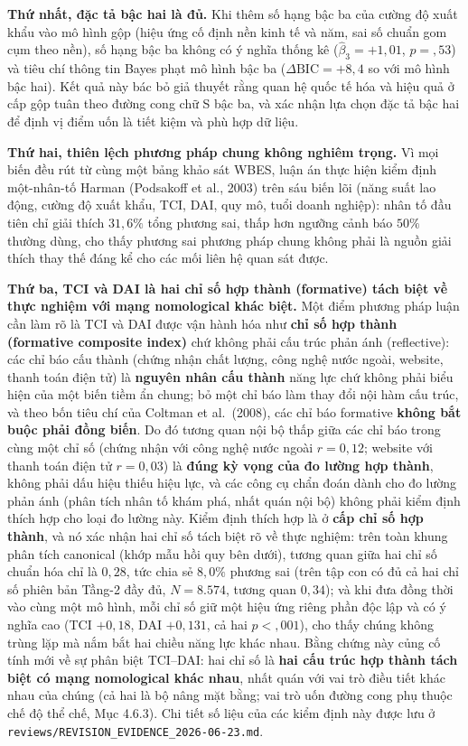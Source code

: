 \documentclass[
  a4paper,
  13pt]{extreport}
\begin{document}
\textbf{Thứ nhất, đặc tả bậc hai là đủ.} Khi thêm số hạng bậc ba của
cường độ xuất khẩu vào mô hình gộp (hiệu ứng cố định nền kinh tế và năm,
sai số chuẩn gom cụm theo nền), số hạng bậc ba không có ý nghĩa thống kê
(\(\hat{\beta}_3 = +1{,}01\), \(p = {,}53\)) và tiêu chí thông tin Bayes
phạt mô hình bậc ba (\(\Delta\mathrm{BIC} = +8{,}4\) so với mô hình bậc
hai). Kết quả này bác bỏ giả thuyết rằng quan hệ quốc tế hóa và hiệu quả
ở cấp gộp tuân theo đường cong chữ S bậc ba, và xác nhận lựa chọn đặc tả
bậc hai để định vị điểm uốn là tiết kiệm và phù hợp dữ liệu.

\textbf{Thứ hai, thiên lệch phương pháp chung không nghiêm trọng.} Vì
mọi biến đều rút từ cùng một bảng khảo sát WBES, luận án thực hiện kiểm
định một-nhân-tố Harman (Podsakoff et al., 2003) trên sáu biến lõi (năng
suất lao động, cường độ xuất khẩu, TCI, DAI, quy mô, tuổi doanh nghiệp):
nhân tố đầu tiên chỉ giải thích \(31{,}6\%\) tổng phương sai, thấp hơn
ngưỡng cảnh báo \(50\%\) thường dùng, cho thấy phương sai phương pháp
chung không phải là nguồn giải thích thay thế đáng kể cho các mối liên
hệ quan sát được.

\textbf{Thứ ba, TCI và DAI là hai chỉ số hợp thành (formative) tách biệt
về thực nghiệm với mạng nomological khác biệt.} Một điểm phương pháp
luận cần làm rõ là TCI và DAI được vận hành hóa như \textbf{chỉ số hợp
thành (formative composite index)} chứ không phải cấu trúc phản ánh
(reflective): các chỉ báo cấu thành (chứng nhận chất lượng, công nghệ
nước ngoài, website, thanh toán điện tử) là \textbf{nguyên nhân cấu
thành} năng lực chứ không phải biểu hiện của một biến tiềm ẩn chung; bỏ
một chỉ báo làm thay đổi nội hàm cấu trúc, và theo bốn tiêu chí của
Coltman et al.~(2008), các chỉ báo formative \textbf{không bắt buộc phải
đồng biến}. Do đó tương quan nội bộ thấp giữa các chỉ báo trong cùng một
chỉ số (chứng nhận với công nghệ nước ngoài \(r = 0{,}12\); website với
thanh toán điện tử \(r = 0{,}03\)) là \textbf{đúng kỳ vọng của đo lường
hợp thành}, không phải dấu hiệu thiếu hiệu lực, và các công cụ chẩn đoán
dành cho đo lường phản ánh (phân tích nhân tố khám phá, nhất quán nội
bộ) không phải kiểm định thích hợp cho loại đo lường này. Kiểm định
thích hợp là ở \textbf{cấp chỉ số hợp thành}, và nó xác nhận hai chỉ số
tách biệt rõ về thực nghiệm: trên toàn khung phân tích canonical (khớp
mẫu hồi quy bên dưới), tương quan giữa hai chỉ số chuẩn hóa chỉ là
\(0{,}28\), tức chia sẻ \(8{,}0\%\) phương sai (trên tập con có đủ cả
hai chỉ số phiên bản Tầng-2 đầy đủ, \(N = 8.574\), tương quan
\(0{,}34\)); và khi đưa đồng thời vào cùng một mô hình, mỗi chỉ số giữ
một hiệu ứng riêng phần độc lập và có ý nghĩa cao (TCI \(+0{,}18\), DAI
\(+0{,}131\), cả hai \(p < {,}001\)), cho thấy chúng không trùng lặp mà
nắm bắt hai chiều năng lực khác nhau. Bằng chứng này củng cố tính mới về
sự phân biệt TCI--DAI: hai chỉ số là \textbf{hai cấu trúc hợp thành tách
biệt có mạng nomological khác nhau}, nhất quán với vai trò điều tiết
khác nhau của chúng (cả hai là bộ nâng mặt bằng; vai trò uốn đường cong
phụ thuộc chế độ thể chế, Mục 4.6.3). Chi tiết số liệu của các kiểm định
này được lưu ở \texttt{reviews/REVISION\_EVIDENCE\_2026-06-23.md}.
\end{document}
